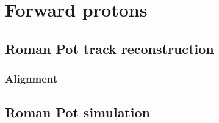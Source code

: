 

\chapter{Forward protons}\label{chap:forwardProtons}

\section{Roman Pot track reconstruction}

\subsection{Alignment}

\section{Roman Pot simulation}

